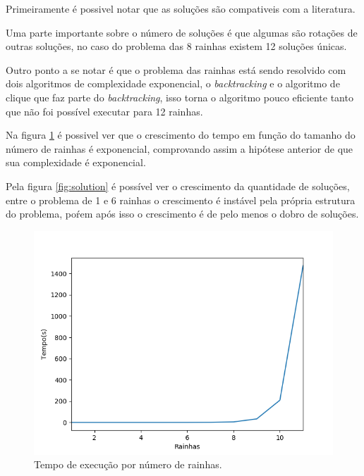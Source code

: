 \documentclass[11pt]{article}
\begin{document}
Primeiramente é possivel notar que as soluções são compativeis com a literatura. \cite{erbas92_differ_n_queen}

Uma parte importante sobre o número de soluções é que algumas são rotações de outras soluções, no caso do problema das 8 rainhas existem 12 soluções únicas. \cite{erbas92_differ_n_queen}

Outro ponto a se notar é que o problema das rainhas está sendo resolvido com dois algoritmos de complexidade exponencial, o \emph{backtracking} e o algoritmo de clique que faz parte do \emph{backtracking}, isso torna o algoritmo pouco eficiente tanto que não foi possível executar para 12 rainhas.

Na figura \ref{fig:time} é possivel ver que o crescimento do tempo em função do tamanho do número de rainhas é exponencial, comprovando assim a hipótese anterior de que sua complexidade é exponencial.

Pela figura \ref{fig:solution} é possível ver o crescimento da quantidade de soluções, entre o problema de 1 e 6 rainhas o crescimento é instável pela própria estrutura do problema, poŕem após isso o crescimento é de pelo menos o dobro de soluções.

\begin{figure}[htbp]
\centering
\includegraphics[width=.9\linewidth]{time.png}
\caption{\label{fig:time}
Tempo de execução por número de rainhas.}
\end{figure}
\end{document}
